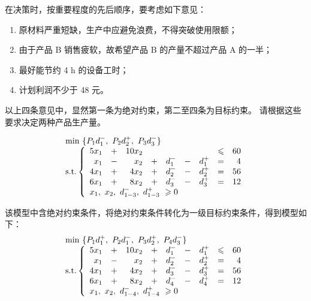 在决策时，按重要程度的先后顺序，要考虑如下意见：
\begin{enumerate}
\item 原材料严重短缺，生产中应避免浪费，不得突破使用限额；
\item 由于产品 B 销售疲软，故希望产品 B 的产量不超过产品 A 的一半；
\item 最好能节约 4 h 的设备工时；
\item 计划利润不少于 48 元。
\end{enumerate}

以上四条意见中，显然第一条为绝对约束，第二至四条为目标约束。
请根据这些要求决定两种产品生产量。



\begin{equation*}
\begin{array}{l}
 \min \ \{P_1d_1^-,\ P_2d_2^+,\  P_3d_3^-\}\\
 \text{s.t.}\left\{ \begin{array}{rrrrrrrrr}
 5x_1&+ & 10x_2 &  &        & &        &\leqslant& 60\\
  x_1&- &   x_2 &+ &d_1^{-} &-& d_1^{+}&        =&  4\\
 4x_1&+ &  4x_2 &+ &d_2^{-} &-& d_2^{+}&        =& 56\\
 6x_1&+ &  8x_2 &+ &d_3^{-} &-& d_3^{+}&        =& 12\\
 \multicolumn{9}{l}{x_1, \ x_2,\  d_{1-3}^-, \ d_{1-3}^{+}\ \geqslant0}
 \end{array} \right.
 \end{array}
\end{equation*}

该模型中含绝对约束条件，将绝对约束条件转化为一级目标约束条件，得到模型如下：
\begin{equation*}
\begin{array}{l}
 \min \ \{P_1d_1^+,\ P_2d_1^-,\ P_3d_2^+,\  P_4d_3^-\}\\
 \text{s.t.}\left\{ \begin{array}{rrrrrrrrr}
 5x_1&+ & 10x_2 & +&d_1^{-} &-& d_1^{+}&\leqslant& 60\\
  x_1&- &   x_2 &+ &d_2^{-} &-& d_2^{+}&        =&  4\\
 4x_1&+ &  4x_2 &+ &d_3^{-} &-& d_3^{+}&        =& 56\\
 6x_1&+ &  8x_2 &+ &d_4^{-} &-& d_4^{+}&        =& 12\\
 \multicolumn{9}{l}{x_1, \ x_2,\  d_{1-4}^-, \ d_{1-4}^{+}\ \geqslant0}
 \end{array} \right.
 \end{array}
\end{equation*}

